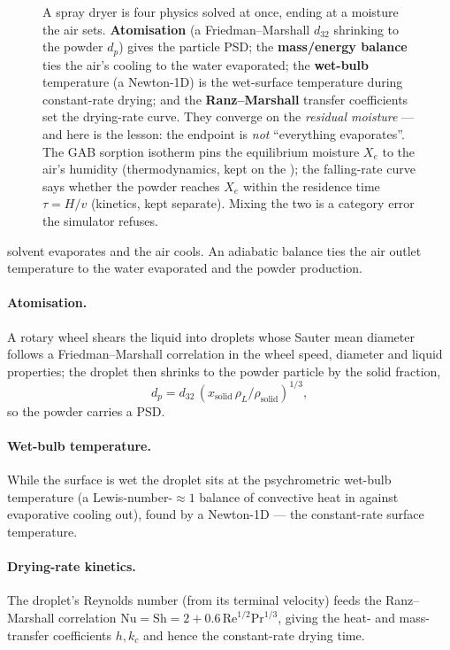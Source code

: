 \documentclass[11pt,a4paper]{article}
\begin{document}
\begin{figure}[ht]
\begin{tikzpicture}
\end{tikzpicture}
\caption{A spray dryer is four physics solved at once, ending at a
moisture the air sets.  \textbf{Atomisation} (a Friedman--Marshall
$d_{32}$ shrinking to the powder $d_p$) gives the particle PSD; the
\textbf{mass/energy balance} ties the air's cooling to the water
evaporated; the \textbf{wet-bulb} temperature (a Newton-1D) is the
wet-surface temperature during constant-rate drying; and the
\textbf{Ranz--Marshall} transfer coefficients set the drying-rate curve.
They converge on the \emph{residual moisture} --- and here is the
lesson: the endpoint is \emph{not} ``everything evaporates''.  The GAB
sorption isotherm pins the equilibrium moisture $X_e$ to the air's
humidity (thermodynamics, kept on the ); the falling-rate
curve says whether the powder reaches $X_e$ within the residence time
$\tau=H/v$ (kinetics, kept separate).  Mixing the two is a category
error the simulator refuses.}
\label{fig:spray-dryer-pieces}
\end{figure}

solvent evaporates and the air cools.  An adiabatic balance ties the
air outlet temperature to the water evaporated and the powder
production.

\paragraph{Atomisation.}  A rotary wheel shears the liquid into
droplets whose Sauter mean diameter follows a Friedman--Marshall
correlation in the wheel speed, diameter and liquid properties; the
droplet then shrinks to the powder particle by the solid fraction,
\begin{equation}
   d_p = d_{32}\,(x_{\text{solid}}\,\rho_L/\rho_{\text{solid}})^{1/3},
\end{equation}
so the powder carries a PSD.

\paragraph{Wet-bulb temperature.}  While the surface is wet the droplet
sits at the psychrometric wet-bulb temperature (a Lewis-number-$\approx
1$ balance of convective heat in against evaporative cooling out), found
by a Newton-1D --- the constant-rate surface temperature.

\paragraph{Drying-rate kinetics.}  The droplet's Reynolds number (from
its terminal velocity) feeds the Ranz--Marshall correlation
$\mathrm{Nu}=\mathrm{Sh}=2+0.6\,\mathrm{Re}^{1/2}\mathrm{Pr}^{1/3}$,
giving the heat- and mass-transfer coefficients $h, k_c$ and hence the
constant-rate drying time.
\end{document}
